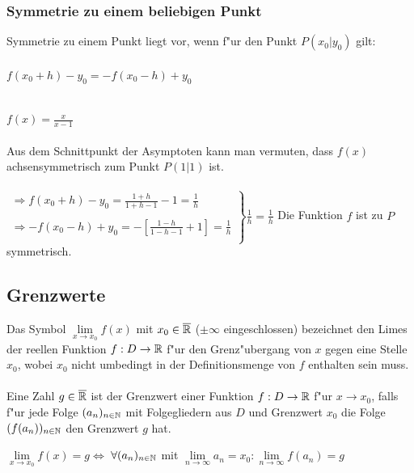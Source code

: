 \subsubsection{Symmetrie zu einem beliebigen Punkt}
\begin{Definition}
Symmetrie zu einem Punkt liegt vor, wenn f"ur den Punkt $P(x_{0}|y_{0})$ gilt:\\
\\
$f(x_{0}+h)-y_{0}=-f(x_{0}-h)+y_{0}$
\end{Definition}
\begin{Beispiel}
\\
$f(x)=\frac{x}{x-1}$\\
\\
Aus dem Schnittpunkt der Asymptoten kann man vermuten, dass $f(x)$ achsensymmetrisch zum Punkt $P(1|1)$ ist.\\
\\
$\left. \begin{array}{rcl}
\Rightarrow f(x_{0}+h)-y_{0}=\frac{1+h}{1+h-1}-1=\frac{1}{h}\\
\\
\Rightarrow -f(x_{0}-h)+y_{0}=-[\frac{1-h}{1-h-1}+1]=\frac{1}{h}\\
\end{array}\right\} \frac{1}{h}=\frac{1}{h}$ Die Funktion $f$ ist zu $P$ symmetrisch.\\
\end{Beispiel}


\subsection{Grenzwerte}

\begin{Definition}
Das Symbol $\lim\limits_{x \rightarrow x_{0}}f(x)$ mit $x_{0} \in \overline{\mathbb{R}}$ ($\pm \infty$ eingeschlossen) bezeichnet den Limes der reellen Funktion $f:D\rightarrow \mathbb{R}$ f"ur den Grenz"ubergang von $x$ gegen eine Stelle $x_{0}$, wobei $x_{0}$ nicht umbedingt in der Definitionsmenge von $f$ enthalten sein muss.\\
\\
Eine Zahl $g \in \overline{\mathbb{R}}$ ist der Grenzwert einer Funktion $f:D\rightarrow \mathbb{R}$ f"ur $x\rightarrow x_{0}$, falls f"ur jede Folge $(a_{n})_{n\in \mathbb{N}}$ mit Folgegliedern aus $D$ und Grenzwert $x_{0}$ die Folge $(f(a_{n}))_{n\in \mathbb{N}}$ den Grenzwert $g$ hat.
\begin{center}
$\lim\limits_{x \rightarrow x_{0}}f(x) = g $\quad $\Leftrightarrow$ \quad $\forall (a_{n})_{n\in \mathbb{N}}$ mit $\lim\limits_{n \rightarrow \infty}a_{n}=x_{0} : \lim\limits_{n \rightarrow \infty}f(a_{n})=g$
\end{center}
\end{Definition}

